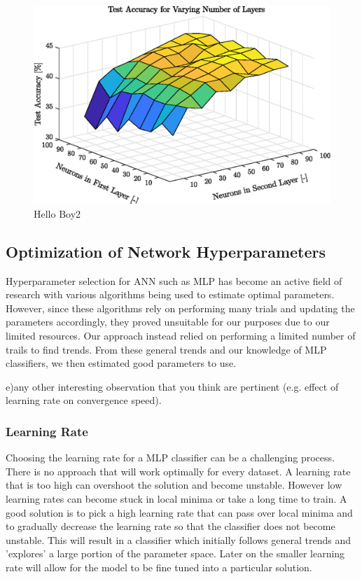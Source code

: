 \begin{figure}[h!]
    \centering
    \includegraphics{images/surfacelayers}
   	\caption{Hello Boy2}
   	\label{fig:surfaceLayers}
\end{figure}

\FloatBarrier

\subsection{Optimization of Network Hyperparameters}\label{subsec:optNet}

Hyperparameter selection for ANN such as MLP has become an active field of research with various algorithms being used to estimate optimal parameters\cite{bergstra2011algorithms}. However, since these algorithms rely on performing many trials and updating the parameters accordingly, they proved unsuitable for our purposes due to our limited resources. Our approach instead relied on performing a limited number of trails to find trends. From these general trends and our knowledge of MLP classifiers, we then estimated good parameters to use.

e)any other interesting observation that you think are pertinent (e.g. effect of learning rate on convergence speed).

\subsubsection{Learning Rate}

Choosing the learning rate for a MLP classifier can be a challenging process. There is no approach that will work optimally for every dataset. A learning rate that is too high can overshoot the solution and become unstable. However low learning rates can become stuck in local minima or take a long time to train. A good solution is to pick a high learning rate that can pass over local minima and  to gradually decrease the learning rate so that the classifier does not become unstable. This will result in a classifier which initially follows general trends and 'explores' a large portion of the parameter space. Later on the smaller learning rate will allow for the model to be fine tuned into a particular solution.

